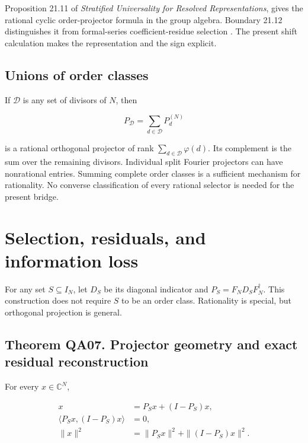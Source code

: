 Proposition 21.11 of \emph{Stratified Universality for Resolved
Representations}, gives the rational cyclic order-projector
formula in the group algebra. Boundary 21.12 distinguishes it from
formal-series coefficient-residue selection \cite{q:KomorebiStratified16}.
The present shift calculation makes the representation and the sign
explicit.

\hypertarget{q:unions-of-order-classes}{%
\subsection{Unions of order
classes}\label{q:unions-of-order-classes}}

If \(\mathcal D\) is any set of divisors of \(N\), then

\[
P_{\mathcal D}=\sum_{d\in\mathcal D}P_d^{(N)}
\]

is a rational orthogonal projector of rank
\(\sum_{d\in\mathcal D}\varphi(d)\). Its complement is the sum over the
remaining divisors. Individual split Fourier projectors can have
nonrational entries. Summing complete order classes is a sufficient
mechanism for rationality. No converse classification of every rational
selector is needed for the present bridge.

\hypertarget{q:selection-residuals-and-information-loss}{%
\section{Selection, residuals, and information
loss}\label{q:selection-residuals-and-information-loss}}

For any set \(S\subseteq I_N\), let \(D_S\) be its diagonal indicator
and \(P_S=F_ND_SF_N^\dagger\). This construction does not require \(S\)
to be an order class. Rationality is special, but orthogonal projection
is general.

\hypertarget{q:theorem-qa07.-projector-geometry-and-exact-residual-reconstruction}{%
\subsection*{Theorem QA07. Projector geometry and exact residual
reconstruction}\label{q:theorem-qa07.-projector-geometry-and-exact-residual-reconstruction}}

For every \(x\in\mathbb C^N\),

\[
\begin{aligned}
x&=P_Sx+(I-P_S)x,\\
\langle P_Sx,(I-P_S)x\rangle&=0,\\
\|x\|^2&=\|P_Sx\|^2+\|(I-P_S)x\|^2.
\end{aligned}
\]

